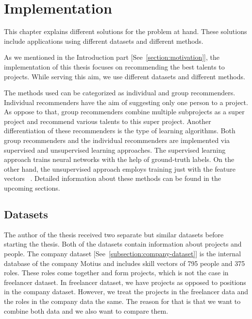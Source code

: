 
\chapter{Implementation}\label{chapter:implementation}

This chapter explains different solutions for the problem at hand. These solutions include applications using different datasets and different methods.

As we mentioned in the Introduction part [See~\autoref{section:motivation}], the implementation of this thesis focuses on recommending the best talents to projects. While serving this aim, we use different datasets and different methods. 


The methods used can be categorized as individual and group recommenders. Individual recommenders have the aim of suggesting only one person to a project. As oppose to that, group recommenders combine multiple subprojects as a super project and recommend various talents to this super project. Another differentiation of these recommenders is the type of learning algorithms. Both group recommenders and the individual recommenders are implemented via supervised and unsupervised learning approaches. The supervised learning approach trains neural networks with the help of ground-truth labels. On the other hand, the unsupervised approach employs training just with the feature vectors ~\parencite{sathya2013comparison}. Detailed information about these methods can be found in the upcoming sections. 

\section{Datasets}\label{section:datasets}

The author of the thesis received two separate but similar datasets before starting the thesis. Both of the datasets contain information about projects and people. The company dataset [See~\autoref{subsection:company-dataset}] is the internal database of the company Motius and includes skill vectors of 795 people and 375 roles. These roles come together and form projects, which is not the case in freelancer dataset. In freelancer dataset, we have projects as opposed to positions in the company dataset. However, we treat the projects in the freelancer data and the roles in the company data the same. The reason for that is that we want to combine both data and we also want to compare them.



